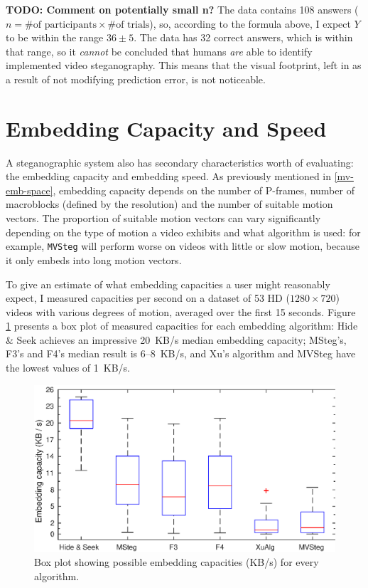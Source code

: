 \documentclass[12pt,british,twoside,notitlepage,usenames,dvipsnames,hypens,final]{report}
\numberwithin{equation}{section}
\numberwithin{figure}{section}
\begin{document}
\textbf{TODO: Comment on potentially small n?}
The data contains 108 answers ($n = \text{\# of participants} \times \text{\# of trials}$), so, according to the formula above, I expect $Y$ to be within the range $36 \pm 5$. The data has 32 correct answers, which is within that range, so it \emph{cannot} be concluded that humans \emph{are} able to identify implemented video steganography. This means that the visual footprint, left in as a result of not modifying prediction error, is not noticeable.

\section{Embedding Capacity and Speed}

A steganographic system also has secondary characteristics worth of evaluating: the embedding capacity and embedding speed. As previously mentioned in \ref{mv-emb-space}, embedding capacity depends on the number of P-frames, number of macroblocks (defined by the resolution) and the number of suitable motion vectors. The proportion of suitable motion vectors can vary significantly depending on the type of motion a video exhibits and what algorithm is used: for example, \texttt{MVSteg} will perform worse on videos with little or slow motion, because it only embeds into long motion vectors. 

To give an estimate of what embedding capacities a user might reasonably expect, I measured capacities per second on a dataset of 53 HD ($1280 \times 720$) videos with various degrees of motion, averaged over the first 15 seconds. Figure \ref{fig:capacities} presents a box plot of measured capacities for each embedding algorithm: Hide \& Seek achieves an impressive 20~KB/s median embedding capacity; MSteg's, F3's and F4's median result is 6--8~KB/s, and Xu's algorithm and MVSteg have the lowest values of 1~KB/s. 

\begin{figure}[tbh]
\centerline{\includegraphics{img/capacities.eps}}
\caption{Box plot showing possible embedding capacities (KB/s) for every algorithm.}
\label{fig:capacities}
\end{figure}
\end{document}
